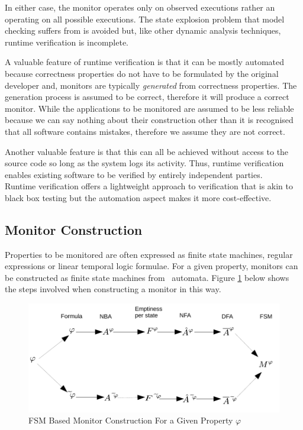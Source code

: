 In either case, the monitor operates only on observed executions rather an operating on all possible executions.  The state explosion problem that model checking suffers from is avoided but, like other dynamic analysis techniques, runtime verification is incomplete.

A valuable feature of runtime verification is that it can be mostly automated because correctness properties do not have to be formulated by the original developer and, monitors are typically \textit{generated} from correctness properties.  The generation process is assumed to be correct, therefore it will produce a correct monitor.  While the applications to be monitored are assumed to be less reliable because we can say nothing about their construction other than it is recognised that all software contains mistakes, therefore we assume they are not correct.

Another valuable feature is that this can all be achieved without access to the source code so long as the system logs its activity.  Thus, runtime verification enables existing software to be verified by entirely independent parties.\\

\noindent Runtime verification offers a lightweight approach to verification that is akin to black box testing but the automation aspect makes it more cost-effective.

\subsection{Monitor Construction}

Properties to be monitored are often expressed as finite state machines, regular expressions or linear temporal logic formulae.  For a given property, monitors can be constructed as finite state machines from \Buchi\ automata.  Figure \ref{fig:FSMConstruction} below shows the steps involved when constructing a monitor in this way.

\begin{figure}[h!]
  \centering
  \includegraphics[width=\textwidth]{graphics/BuchiContructionFlow}
  \caption{FSM Based Monitor Construction For a Given Property $\varphi$\cite{RVForLTLAndTLTL}}
  \label{fig:FSMConstruction}
\end{figure}

